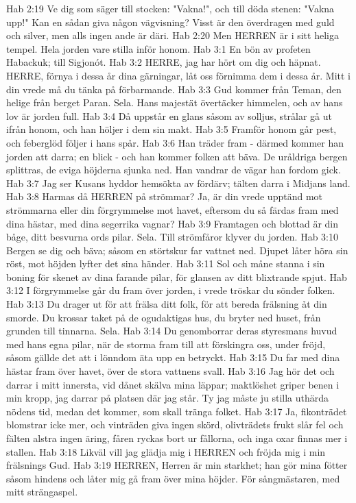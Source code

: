Hab 2:19  Ve dig som säger till stocken: "Vakna!", och till döda stenen: "Vakna upp!" Kan en sådan giva någon vägvisning? Visst är den överdragen med guld och silver, men alls ingen ande är däri.
Hab 2:20  Men HERREN är i sitt heliga tempel. Hela jorden vare stilla inför honom.
Hab 3:1  En bön av profeten Habackuk; till Sigjonót.
Hab 3:2  HERRE, jag har hört om dig och häpnat. HERRE, förnya i dessa år dina gärningar, låt oss förnimma dem i dessa år. Mitt i din vrede må du tänka på förbarmande.
Hab 3:3  Gud kommer från Teman, den helige från berget Paran. Sela. Hans majestät övertäcker himmelen, och av hans lov är jorden full.
Hab 3:4  Då uppstår en glans såsom av solljus, strålar gå ut ifrån honom, och han höljer i dem sin makt.
Hab 3:5  Framför honom går pest, och feberglöd följer i hans spår.
Hab 3:6  Han träder fram - därmed kommer han jorden att darra; en blick - och han kommer folken att bäva. De uråldriga bergen splittras, de eviga höjderna sjunka ned. Han vandrar de vägar han fordom gick.
Hab 3:7  Jag ser Kusans hyddor hemsökta av fördärv; tälten darra i Midjans land.
Hab 3:8  Harmas då HERREN på strömmar? Ja, är din vrede upptänd mot strömmarna eller din förgrymmelse mot havet, eftersom du så färdas fram med dina hästar, med dina segerrika vagnar?
Hab 3:9  Framtagen och blottad är din båge, ditt besvurna ords pilar. Sela. Till strömfåror klyver du jorden.
Hab 3:10  Bergen se dig och bäva; såsom en störtskur far vattnet ned. Djupet låter höra sin röst, mot höjden lyfter det sina händer.
Hab 3:11  Sol och måne stanna i sin boning för skenet av dina farande pilar, för glansen av ditt blixtrande spjut.
Hab 3:12  I förgrymmelse går du fram över jorden, i vrede tröskar du sönder folken.
Hab 3:13  Du drager ut för att frälsa ditt folk, för att bereda frälsning åt din smorde. Du krossar taket på de ogudaktigas hus, du bryter ned huset, från grunden till tinnarna. Sela.
Hab 3:14  Du genomborrar deras styresmans huvud med hans egna pilar, när de storma fram till att förskingra oss, under fröjd, såsom gällde det att i lönndom äta upp en betryckt.
Hab 3:15  Du far med dina hästar fram över havet, över de stora vattnens svall.
Hab 3:16  Jag hör det och darrar i mitt innersta, vid dånet skälva mina läppar; maktlöshet griper benen i min kropp, jag darrar på platsen där jag står. Ty jag måste ju stilla uthärda nödens tid, medan det kommer, som skall tränga folket.
Hab 3:17  Ja, fikonträdet blomstrar icke mer, och vinträden giva ingen skörd, olivträdets frukt slår fel och fälten alstra ingen äring, fåren ryckas bort ur fållorna, och inga oxar finnas mer i stallen.
Hab 3:18  Likväl vill jag glädja mig i HERREN och fröjda mig i min frälsnings Gud.
Hab 3:19  HERREN, Herren är min starkhet; han gör mina fötter såsom hindens och låter mig gå fram över mina höjder. För sångmästaren, med mitt strängaspel.


